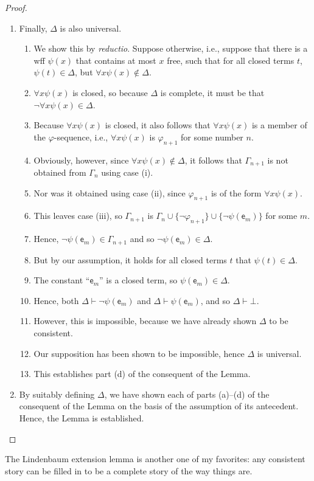 \documentclass[12pt]{report}
\theoremstyle{nonumberplain}
\newtheorem{proof}{Proof}
\renewcommand{\o}[1]{\mathsf{#1}}
\begin{document}
\begin{proof}
\begin{enumerate}
\item Finally, $Δ$ is also universal.
\begin{enumerate}[label={\alph*)}]
\item We show this by \emph{reductio}. Suppose
 otherwise, i.e., suppose that there is a wff $ψ(x)$
 that contains at most $x$ free, such that for all
 closed terms $t$, $ψ(t) ∈Δ$, but $∀x ψ (x) \notin Δ$.
\item $∀x ψ (x)$ is closed, so because $Δ$ is complete,
 it must be that $¬∀x ψ (x) ∈Δ$.
\item Because $∀x ψ (x)$ is closed, it also follows
 that $∀x ψ (x)$ is a member of the $φ$-sequence,
 i.e., $∀x ψ (x)$ is $φ_{n+1}$ for some number $n$.
\item Obviously, however, since $∀x ψ (x) \notin Δ$, it
 follows that $Γ_{n+1}$ is not obtained from $Γ_n$ using
 case (i).
\item Nor was it obtained using case (ii), since $φ_{n+1}$ is of the form $∀x ψ (x)$.
\item This leaves case (iii), so $Γ_{n+1}$ is
 $Γ_n ∪ \{¬φ_{n+1}\} ∪ \{¬ψ (\o{e}_m)\}$ for some $m$.
\item Hence, $¬ψ (\o{e}_m) ∈ Γ_{n+1}$ and so $¬ψ (\o{e}_m) ∈ Δ$.
\item But by our assumption, it holds for all closed terms $t$  that $ψ(t) ∈Δ$.
\item The constant ``$\o{e}_m$'' is a closed term, so
 $ψ (\o{e}_m) ∈ Δ$.
\item Hence, both $Δ ⊢  ¬ψ (\o{e}_m)$ and $Δ ⊢  ψ (\o{e}_m)$, and so $Δ ⊢ ⊥$.
\item However, this is impossible, because we have already shown $Δ$ to be consistent.
\item Our supposition has been shown to be
 impossible, hence $Δ$ is universal.
\item This establishes part (d) of the consequent of
 the Lemma.
\end{enumerate}

\item By suitably defining $Δ$, we have shown each of parts (a)--(d) of the consequent of the Lemma on the basis of the assumption of its antecedent. Hence, the Lemma is established.
\end{enumerate}
\end{proof}

\noindent The Lindenbaum extension lemma is another one of my favorites: any consistent story can be filled in to be a complete story of the way things are.
\end{document}
